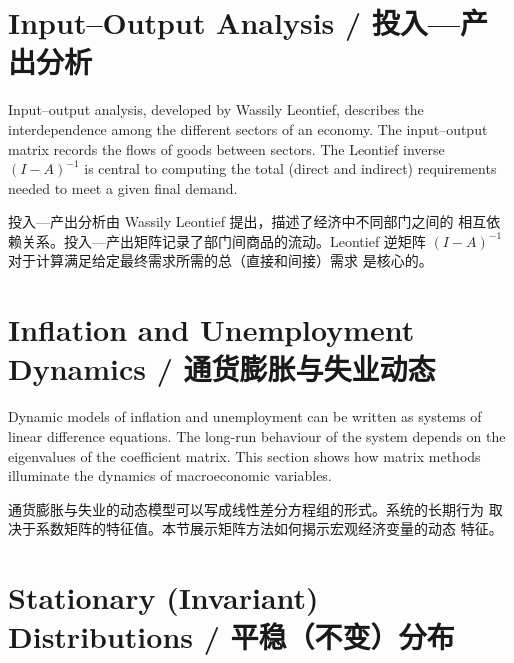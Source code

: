 \section{Input--Output Analysis / 投入—产出分析}

\begin{original}
Input–output analysis, developed by Wassily Leontief, describes the
interdependence among the different sectors of an economy.  The
input–output matrix records the flows of goods between sectors.  The
Leontief inverse $(I - A)^{-1}$ is central to computing the total
(direct and indirect) requirements needed to meet a given final demand.
\end{original}
\begin{translation}
投入—产出分析由 Wassily Leontief 提出，描述了经济中不同部门之间的
相互依赖关系。投入—产出矩阵记录了部门间商品的流动。Leontief 逆矩阵
$(I - A)^{-1}$ 对于计算满足给定最终需求所需的总（直接和间接）需求
是核心的。
\end{translation}

\section{Inflation and Unemployment Dynamics / 通货膨胀与失业动态}

\begin{original}
Dynamic models of inflation and unemployment can be written as systems
of linear difference equations.  The long-run behaviour of the system
depends on the eigenvalues of the coefficient matrix.  This section
shows how matrix methods illuminate the dynamics of macroeconomic
variables.
\end{original}
\begin{translation}
通货膨胀与失业的动态模型可以写成线性差分方程组的形式。系统的长期行为
取决于系数矩阵的特征值。本节展示矩阵方法如何揭示宏观经济变量的动态
特征。
\end{translation}

\section{Stationary (Invariant) Distributions / 平稳（不变）分布}

